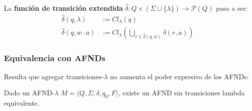 La \textbf{función de transición extendida} $\hat \delta : Q \times (\Sigma \cup \{\lambda\}) \to \mathcal P (Q)$ pasa a ser:
$$
\begin{aligned}
    \hat \delta (q, \lambda) & := Cl_\lambda(q) \\
    \hat \delta (q, w \cdot a) & := Cl_\lambda\left(\bigcup_{r \in \hat \delta(q, w)} \delta(r, a) \right)
\end{aligned}
$$

\subsubsection{Equivalencia con AFNDs}

Resulta que agregar transiciones-$\lambda$ no aumenta el poder expresivo de los AFNDs:

\begin{theorem*}
    Dado un AFND-$\lambda$ $M = \langle Q, \Sigma, \delta, q_0, F \rangle$, existe un AFND sin transiciones lambda equivalente.
\end{theorem*}
